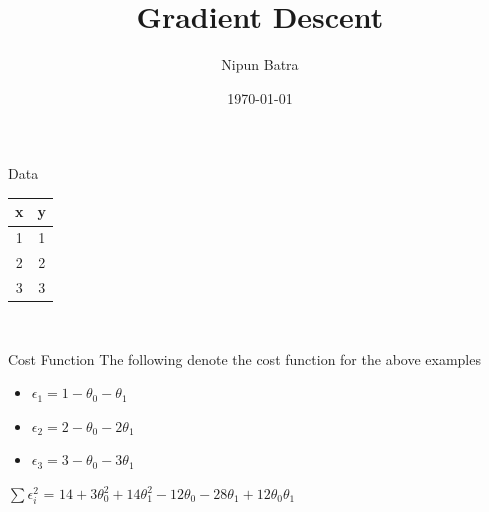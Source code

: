 \documentclass{beamer}
\title{Gradient Descent}
\date{\today}
\author{Nipun Batra}
\institute{IIT Gandhinagar}
\begin{document}
  \maketitle
  
  
\begin{frame}{Data}

\begin{center}
    \begin{tabular}{|c|c|}
    \hline
    \hline
     x&y  \\
     \hline
     1&1\\
     2&2\\
     3&3\\
     \hline
\end{tabular}\\

\end{center}

\end{frame}
  

\begin{frame}{Cost Function}
    The following denote the cost function for the above examples
    
    \begin{itemize}
        \item $\epsilon_{1} =1 -  \theta_{0} - \theta_{1}$
        \item $\epsilon_{2} =2 -  \theta_{0} - 2\theta_{1}$
        \item $\epsilon_{3} =3 -  \theta_{0} - 3\theta_{1}$
    \end{itemize}
    
    $\sum \epsilon_{i}^{2}$ = $14+3\theta_{0}^{2}+14\theta_{1}^{2}-12\theta_{0}-28\theta_{1}+12\theta_{0}\theta_{1}$
\end{frame}
\end{document}
